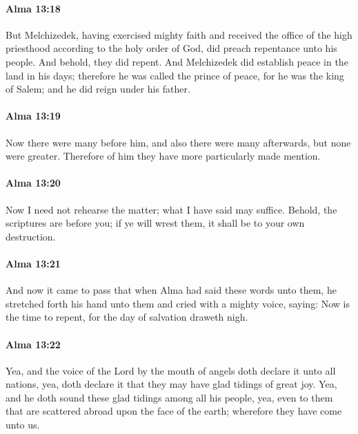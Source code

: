 		\paragraph{Alma 13:18} %
			\label{ALMA-13-18}

			But Melchizedek, having exercised mighty faith
			and received the office of the high priesthood
			according to the holy order of God,
			did preach repentance unto his people.
			And behold, they did repent.
			And Melchizedek did establish peace in the land in his days;
			therefore he was called the prince of peace,
			for he was the king of Salem;
			and he did reign under his father.

		\paragraph{Alma 13:19} %
			\label{ALMA-13-19}

			Now there were many before him,
			and also there were many afterwards,
			but none were greater.
			Therefore of him they have more particularly made mention.

		\paragraph{Alma 13:20} %
			\label{ALMA-13-20}

			Now I need not rehearse the matter;
			what I have said may suffice.
			Behold, the scriptures are before you;
			if ye will wrest them, it shall be to your own destruction.

		\paragraph{Alma 13:21} %
			\label{ALMA-13-21}

			And now it came to pass that when Alma had said these words unto them,
			he stretched forth his hand unto them and cried with a mighty voice, saying:
			Now is the time to repent,
			for the day of salvation draweth nigh.

		\paragraph{Alma 13:22} %
			\label{ALMA-13-22}

			Yea, and the voice of the Lord by the mouth of angels
			doth declare it unto all nations,
			yea, doth declare it that they may have glad tidings of great joy.
			Yea, and he doth sound these glad tidings among all his people,
			yea, even to them that are scattered abroad upon the face of the earth;
			wherefore they have come unto us.

